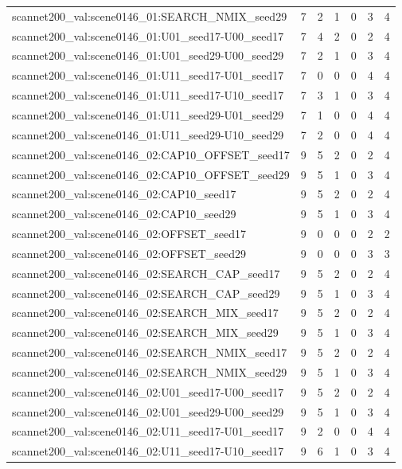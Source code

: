 \begin{table}[t]
\begin{tabular}{lrrrrrr}
scannet200\_val:scene0146\_01:SEARCH\_NMIX\_seed29 & 7 & 2 & 1 & 0 & 3 & 4 \\
scannet200\_val:scene0146\_01:U01\_seed17-U00\_seed17 & 7 & 4 & 2 & 0 & 2 & 4 \\
scannet200\_val:scene0146\_01:U01\_seed29-U00\_seed29 & 7 & 2 & 1 & 0 & 3 & 4 \\
scannet200\_val:scene0146\_01:U11\_seed17-U01\_seed17 & 7 & 0 & 0 & 0 & 4 & 4 \\
scannet200\_val:scene0146\_01:U11\_seed17-U10\_seed17 & 7 & 3 & 1 & 0 & 3 & 4 \\
scannet200\_val:scene0146\_01:U11\_seed29-U01\_seed29 & 7 & 1 & 0 & 0 & 4 & 4 \\
scannet200\_val:scene0146\_01:U11\_seed29-U10\_seed29 & 7 & 2 & 0 & 0 & 4 & 4 \\
scannet200\_val:scene0146\_02:CAP10\_OFFSET\_seed17 & 9 & 5 & 2 & 0 & 2 & 4 \\
scannet200\_val:scene0146\_02:CAP10\_OFFSET\_seed29 & 9 & 5 & 1 & 0 & 3 & 4 \\
scannet200\_val:scene0146\_02:CAP10\_seed17 & 9 & 5 & 2 & 0 & 2 & 4 \\
scannet200\_val:scene0146\_02:CAP10\_seed29 & 9 & 5 & 1 & 0 & 3 & 4 \\
scannet200\_val:scene0146\_02:OFFSET\_seed17 & 9 & 0 & 0 & 0 & 2 & 2 \\
scannet200\_val:scene0146\_02:OFFSET\_seed29 & 9 & 0 & 0 & 0 & 3 & 3 \\
scannet200\_val:scene0146\_02:SEARCH\_CAP\_seed17 & 9 & 5 & 2 & 0 & 2 & 4 \\
scannet200\_val:scene0146\_02:SEARCH\_CAP\_seed29 & 9 & 5 & 1 & 0 & 3 & 4 \\
scannet200\_val:scene0146\_02:SEARCH\_MIX\_seed17 & 9 & 5 & 2 & 0 & 2 & 4 \\
scannet200\_val:scene0146\_02:SEARCH\_MIX\_seed29 & 9 & 5 & 1 & 0 & 3 & 4 \\
scannet200\_val:scene0146\_02:SEARCH\_NMIX\_seed17 & 9 & 5 & 2 & 0 & 2 & 4 \\
scannet200\_val:scene0146\_02:SEARCH\_NMIX\_seed29 & 9 & 5 & 1 & 0 & 3 & 4 \\
scannet200\_val:scene0146\_02:U01\_seed17-U00\_seed17 & 9 & 5 & 2 & 0 & 2 & 4 \\
scannet200\_val:scene0146\_02:U01\_seed29-U00\_seed29 & 9 & 5 & 1 & 0 & 3 & 4 \\
scannet200\_val:scene0146\_02:U11\_seed17-U01\_seed17 & 9 & 2 & 0 & 0 & 4 & 4 \\
scannet200\_val:scene0146\_02:U11\_seed17-U10\_seed17 & 9 & 6 & 1 & 0 & 3 & 4 \\

\end{tabular}
\end{table}
